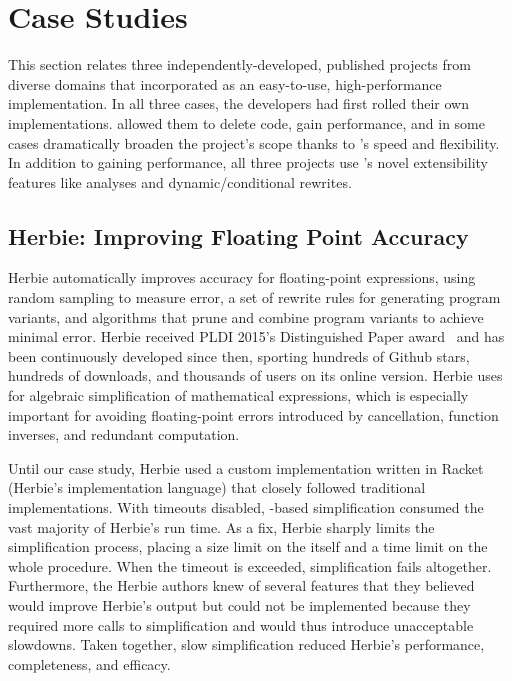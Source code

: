 \section{Case Studies}
\label{sec:case-studies}

This section relates three independently-developed, published projects from diverse domains
  that incorporated \egg
  as an easy-to-use, high-performance \egraph implementation.
In all three cases, the developers had first rolled their own \egraph
  implementations.
\Egg allowed them to delete code, gain performance, and in some cases
  dramatically broaden the project's scope thanks to \egg's speed and
  flexibility.
In addition to gaining performance, all three projects use \egg's novel
  extensibility features like \eclass analyses and dynamic/conditional rewrites.

\subsection{Herbie: Improving Floating Point Accuracy}
\label{sec:herbie}

Herbie automatically improves accuracy
  for floating-point expressions,
  using random sampling to measure error,
  a set of rewrite rules for generating program variants,
  and algorithms that prune and combine program variants
  to achieve minimal error.
Herbie received PLDI 2015's Distinguished Paper award~\cite{herbie}
  and has been continuously developed since then,
  sporting hundreds of Github stars, hundreds of downloads,
  and thousands of users on its online version.
Herbie uses \egraphs for algebraic simplification of mathematical expressions,
  which is especially important for avoiding floating-point errors
  introduced by cancellation, function inverses, and redundant computation.

Until our case study,
  Herbie used a custom \egraph implementation
  written in Racket (Herbie's implementation language)
  that closely followed traditional \egraph implementations.
With timeouts disabled,
  \egraph-based simplification consumed
  the vast majority of Herbie's run time.
As a fix, Herbie sharply limits the simplification process,
  placing a size limit on the \egraph itself and a time limit on the whole
  procedure.
When the timeout is exceeded, simplification fails altogether.
Furthermore, the Herbie authors knew of several features
  that they believed would improve Herbie's output
  but could not be implemented because
  they required more calls to simplification
  and would thus introduce unacceptable slowdowns.
Taken together, slow simplification reduced Herbie's performance, completeness,
  and efficacy.


